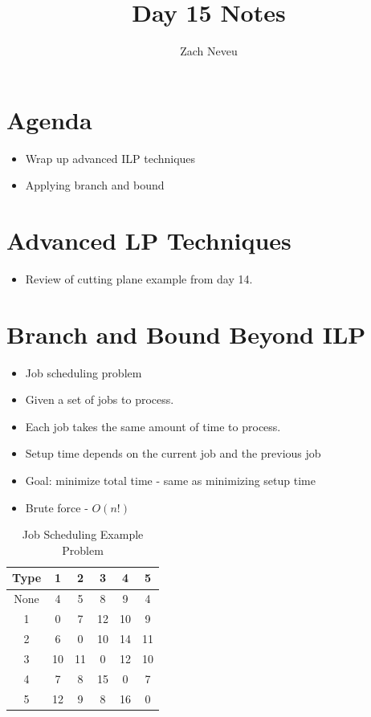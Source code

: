 \documentclass[12pt, letter]{article}
\author{Zach Neveu}
\title{ Day 15 Notes }
\begin{document}
\maketitle

\section{Agenda}%
\label{sec:agenda}
\begin{itemize}
	\item Wrap up advanced ILP techniques
	\item Applying branch and bound
\end{itemize}

\section{Advanced LP Techniques}%
\label{sec:advanced_lp_techniques}
\begin{itemize}
	\item Review of cutting plane example from day 14.
\end{itemize}

\section{Branch and Bound Beyond ILP}%
\label{sec:branch_and_bound_beyond_ilp}
\begin{itemize}
	\item Job scheduling problem
	\item Given a set of jobs to process.
	\item Each job takes the same amount of time to process.
	\item Setup time depends on the current job and the previous job
	\item Goal: minimize total time - same as minimizing setup time
	\item Brute force - $O(n!)$
\end{itemize}

\begin{table}[h]
	\centering
	\caption{Job Scheduling Example Problem}
	\label{tab:label}
	\begin{tabular}{|c|c|c|c|c|c|}
	\hline
	Type & 1 & 2 & 3 & 4 & 5 \\
	\hline
	None & 4 & 5 & 8 & 9 & 4 \\
	\hline
	1 & 0 & 7 & 12 & 10 & 9 \\
	\hline
	2 & 6 & 0 & 10 & 14 & 11 \\
	\hline
	3 & 10 & 11 & 0 & 12 & 10 \\
	\hline
	4 & 7 & 8 & 15 & 0 & 7 \\
	\hline
	5 & 12 & 9 & 8 & 16 & 0 \\
	\hline
	\end{tabular}
\end{table}
\end{document}
